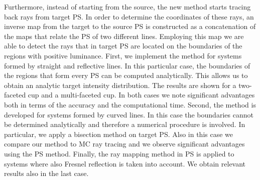 Furthermore, instead of starting from the source, the new method starts tracing back rays from target PS. 
In order to determine the coordinates of these rays, an inverse map from the target to the source PS is constructed as a concatenation of the maps that relate the PS of two different lines.
Employing this map we are able to detect the rays that in target PS are located on the boundaries of the regions with positive luminance. 
First, we implement the method for systems formed by straight and reflective lines. In this particular case, the boundaries of the regions that form every PS can be computed analytically. This allows us to obtain an analytic target intensity distribution. The results are shown for a two-faceted cup and a multi-faceted cup. In both cases we note significant advantages both in terms of the accuracy and the computational time. Second, the method is developed for systems formed by curved lines. In this case the boundaries cannot be determined analytically and therefore a numerical procedure is involved. In particular, we apply a bisection method on target PS. Also in this case we compare our method to MC ray tracing and we observe significant advantages using the PS method. Finally, the ray mapping method in PS is applied to systems where also Fresnel reflection is taken into account. We obtain relevant results also in the last case.